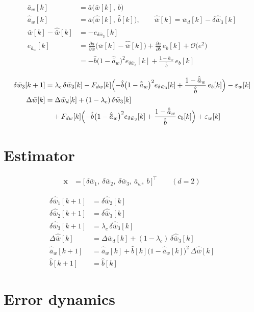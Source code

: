 \documentclass[11pt,a4paper,fontset=none]{ctexart}
\newcommand{\ba}{\bar{a}}
\newcommand{\bw}{\bar{w}}
\newcommand{\dW}{\Delta\bw}
\newcommand{\dWh}{\Delta\hat{\bw}}
\newcommand{\ah}{\hat{\ba}_w}
\newcommand{\bh}{\hat{b}}
\begin{document}
\begin{align*}
\ba_w[k]   &= \ba\bigl(\bw[k],\ b\bigr) \\
\ah[k]     &= \ba\bigl(\hat{\bw}[k],\ \bh[k]\bigr), \qquad \hat{\bw}[k] = \bw_d[k] - \delta\hat{\bw}_3[k] \\
\bw[k] - \hat{\bw}[k] &= -e_{\delta\bw_3}[k] \\
e_{\ba_w}[k] &= \frac{\partial\ba}{\partial\bw}\bigl(\bw[k] - \hat{\bw}[k]\bigr) + \frac{\partial\ba}{\partial b}\,e_b[k] + \mathcal{O}\bigl(e^{2}\bigr) \\
             &= -\bh\bigl(1-\ah\bigr)^{2}e_{\delta\bw_3}[k] + \frac{1-\ah}{\bh}\,e_b[k]
\end{align*}

\begin{align*}
\delta\bw_3[k+1] &= \lambda_c\,\delta\bw_3[k]
                    - F_{dw}[k]\Bigl(-\bh\bigl(1-\ah\bigr)^{2}e_{\delta\bw_3}[k] + \frac{1-\ah}{\bh}\,e_b[k]\Bigr) - \varepsilon_w[k] \\
\dW[k]           &= \Delta\bw_d[k] + (1-\lambda_c)\,\delta\bw_3[k] \\
                 &\quad + F_{dw}[k]\Bigl(-\bh\bigl(1-\ah\bigr)^{2}e_{\delta\bw_3}[k] + \frac{1-\ah}{\bh}\,e_b[k]\Bigr) + \varepsilon_w[k]
\end{align*}

\section{Estimator}

\begin{align*}
\mathbf{x} &= \bigl[\,\delta\bw_1,\ \delta\bw_2,\ \delta\bw_3,\ \ba_w,\ b\,\bigr]^{\top} \qquad (d = 2)
\end{align*}

\begin{align*}
\delta\hat{\bw}_1[k+1] &= \delta\hat{\bw}_2[k] \\
\delta\hat{\bw}_2[k+1] &= \delta\hat{\bw}_3[k] \\
\delta\hat{\bw}_3[k+1] &= \lambda_c\,\delta\hat{\bw}_3[k] \\
\dWh[k]                &= \Delta\bw_d[k] + (1-\lambda_c)\,\delta\hat{\bw}_3[k] \\
\ah[k+1]               &= \ah[k] + \bh[k]\bigl(1-\ah[k]\bigr)^{2}\,\dWh[k] \\
\bh[k+1]               &= \bh[k]
\end{align*}

\section{Error dynamics}
\end{document}
